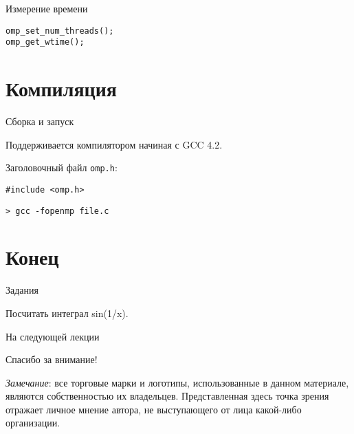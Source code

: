 \begin{frame}[fragile]{Измерение времени}

\begin{lstlisting}
omp_set_num_threads();
omp_get_wtime();
\end{lstlisting}

\end{frame}

\section{Компиляция}

\begin{frame}[fragile]{Сборка и запуск}

Поддерживается компилятором начиная с GCC 4.2.

Заголовочный файл \texttt{omp.h}:

\begin{lstlisting}
#include <omp.h>
\end{lstlisting}

\begin{lstlisting}
> gcc -fopenmp file.c
\end{lstlisting}

\end{frame}

\section*{Конец}

\begin{frame}{Задания}

Посчитать интеграл sin(1/x).

\end{frame}

\begin{frame}{На следующей лекции}
\end{frame}

\begin{frame}

{\huge{Спасибо за внимание!}\par}

\vfill

\tiny{\textit{Замечание}: все торговые марки и логотипы, использованные в данном материале, являются собственностью их владельцев. Представленная здесь точка зрения отражает личное мнение автора, не выступающего от лица какой-либо организации.}

\end{frame}


